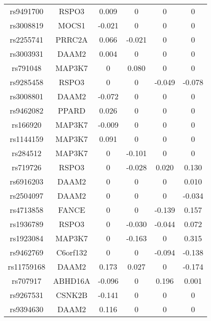 \documentclass[12pt]{article}
\begin{document}
\begin{longtable} [ht!]{c c c c c c}
	rs9491700&RSPO3	&0.009&	0&	0&	0\\
	
	rs3008819&MOCS1	&-0.021&	0&	0&	0\\
	
	rs2255741&PRRC2A	&0.066&	-0.021&	0&	0\\
	
	rs3003931&DAAM2	&0.004&	0&	0&	0\\
	
	rs791048&MAP3K7	&0&	0.080&	0&	0\\
	
	rs9285458&RSPO3	&0&	0&	-0.049&	-0.078\\
	
	rs3008801&DAAM2	&-0.072&	0&	0&	0\\
	
	rs9462082&PPARD	&0.026&	0&	0&	0\\
	
	rs166920&MAP3K7	&-0.009&	0&	0&	0\\
	
	rs1144159&MAP3K7	&0.091&	0&	0&	0\\
	
	rs284512&MAP3K7	&0&	-0.101&	0&	0\\
	
	rs719726&RSPO3	&0&	-0.028&	0.020&	0.130\\
	
	rs6916203&DAAM2	&0&	0&	0&	0.010\\
	
	rs2504097&DAAM2	&0&	0&	0&	-0.034\\
	
	rs4713858&FANCE&0&0&-0.139&0.157\\
	
	rs1936789&RSPO3	&0&	-0.030&	-0.044&	0.072\\
	
	rs1923084&MAP3K7	&0&	-0.163&	0&	0.315\\
	
	rs9462769&C6orf132	&0&	0&	-0.094&	-0.138\\
	
	rs11759168&DAAM2	&0.173&	0.027&	0&	-0.174\\
	
	rs707917&ABHD16A	&-0.096&	0&	0.196&	0.001\\
	
	rs9267531&CSNK2B	&-0.141&	0&	0&	0\\
	
	rs9394630&DAAM2	&0.116&	0&	0&	0\\
	

\end{longtable}
\end{document}
